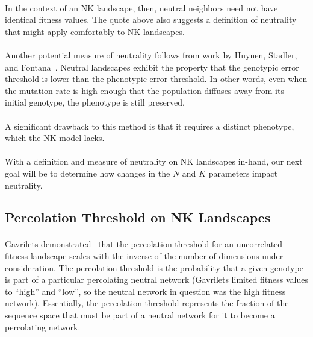 \documentclass[12pt,letterpaper,titlepage]{article}
\begin{document}
\paragraph{}
In the context of an NK landscape, then, neutral neighbors need not have
identical fitness values. The quote above also suggests a definition of
neutrality that might apply comfortably to NK landscapes.

\paragraph{}
Another potential measure of neutrality follows from work by Huynen, Stadler,
and Fontana~\cite{Huynen1996a}. Neutral landscapes exhibit the property that
the genotypic error threshold is lower than the phenotypic error threshold. In
other words, even when the mutation rate is high enough that the population
diffuses away from its initial genotype, the phenotype is still preserved.

\paragraph{}
A significant drawback to this method is that it requires a distinct phenotype,
which the NK model lacks.

\paragraph{}
With a definition and measure of neutrality on NK landscapes in-hand, our next
goal will be to determine how changes in the $N$ and $K$ parameters impact
neutrality.

\subsection{Percolation Threshold on NK Landscapes}

\paragraph{}
Gavrilets demonstrated~\cite{Gavrilets1997} that the percolation threshold for
an uncorrelated fitness landscape scales with the inverse of the number of
dimensions under consideration. The percolation threshold is the probability
that a given genotype is part of a particular percolating neutral network
(Gavrilets limited fitness values to ``high'' and ``low'', so the neutral
network in question was the high fitness network). Essentially, the percolation
threshold represents the fraction of the sequence space that must be part of a
neutral network for it to become a percolating network.
\end{document}
